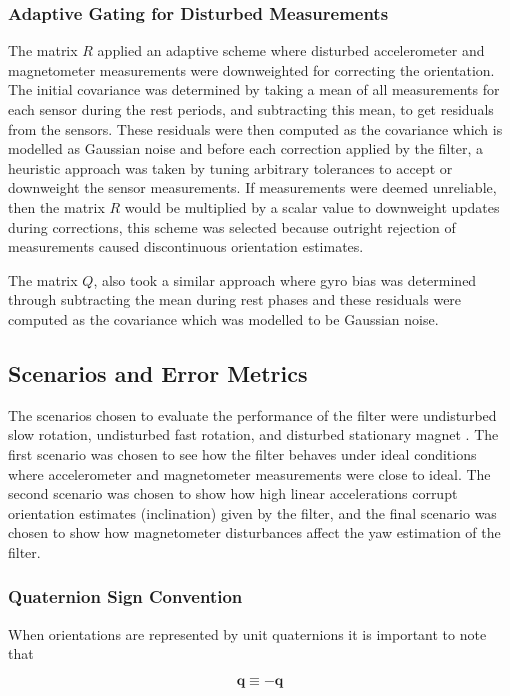 \subsubsection{Adaptive Gating for Disturbed Measurements}

The matrix $R$ applied an adaptive scheme where disturbed accelerometer and 
magnetometer measurements were downweighted for correcting the orientation. The initial covariance
was determined by taking a mean of all measurements for each sensor during the rest periods, 
and subtracting this mean, to get residuals from the sensors. These
residuals were then computed as the covariance which is modelled as Gaussian noise and before each correction applied by the filter, 
a heuristic approach was taken by tuning arbitrary tolerances to accept or downweight the sensor
measurements. If measurements were deemed unreliable, then the matrix $R$ would be multiplied by a scalar
value to downweight updates during corrections, this scheme was selected because outright rejection of measurements caused 
discontinuous orientation estimates.

The matrix $Q$, also took a similar approach where gyro bias was determined through subtracting 
the mean during rest phases and these residuals were computed as the covariance which was modelled to be Gaussian noise. 
\newpage
\subsection{Scenarios and Error Metrics}
The scenarios chosen to evaluate the performance of the filter were undisturbed slow rotation,
undisturbed fast rotation, and disturbed stationary magnet \cite{laidig_2021_broada}. The first scenario was chosen to
see how the filter behaves under ideal conditions where accelerometer and magnetometer measurements
were close to ideal. The second scenario was chosen to show how high linear accelerations corrupt orientation
estimates (inclination) given by the filter, and the final scenario was chosen to show how magnetometer disturbances
affect the yaw estimation of the filter. 

\subsubsection{Quaternion Sign Convention}
When orientations are represented by unit quaternions it is important to note that 

\begin{equation}
\mathbf{q} \equiv -\mathbf{q}
\end{equation}

